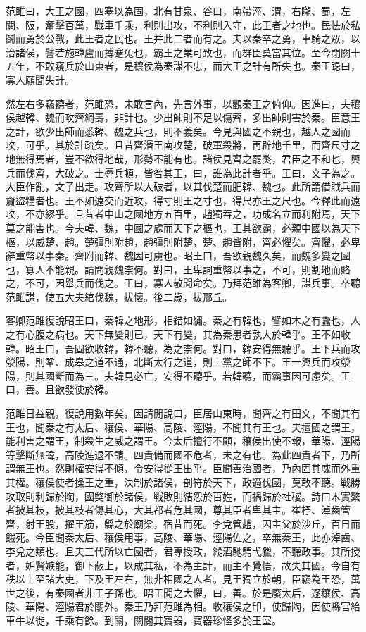 范雎曰，大王之國，四塞以為固，北有甘泉、谷口，南帶涇、渭，右隴、蜀，左關、阪，奮擊百萬，戰車千乘，利則出攻，不利則入守，此王者之地也。民怯於私鬬而勇於公戰，此王者之民也。王并此二者而有之。夫以秦卒之勇，車騎之眾，以治諸侯，譬若施韓盧而搏蹇兔也，霸王之業可致也，而群臣莫當其位。至今閉關十五年，不敢窺兵於山東者，是穰侯為秦謀不忠，而大王之計有所失也。秦王跽曰，寡人願聞失計。

然左右多竊聽者，范雎恐，未敢言內，先言外事，以觀秦王之俯仰。因進曰，夫穰侯越韓、魏而攻齊綱壽，非計也。少出師則不足以傷齊，多出師則害於秦。臣意王之計，欲少出師而悉韓、魏之兵也，則不義矣。今見與國之不親也，越人之國而攻，可乎。其於計疏矣。且昔齊湣王南攻楚，破軍殺將，再辟地千里，而齊尺寸之地無得焉者，豈不欲得地哉，形勢不能有也。諸侯見齊之罷獘，君臣之不和也，興兵而伐齊，大破之。士辱兵頓，皆咎其王，曰，誰為此計者乎。王曰，文子為之。大臣作亂，文子出走。攻齊所以大破者，以其伐楚而肥韓、魏也。此所謂借賊兵而齎盜糧者也。王不如遠交而近攻，得寸則王之寸也，得尺亦王之尺也。今釋此而遠攻，不亦繆乎。且昔者中山之國地方五百里，趙獨吞之，功成名立而利附焉，天下莫之能害也。今夫韓、魏，中國之處而天下之樞也，王其欲霸，必親中國以為天下樞，以威楚、趙。楚彊則附趙，趙彊則附楚，楚、趙皆附，齊必懼矣。齊懼，必卑辭重幣以事秦。齊附而韓、魏因可虜也。昭王曰，吾欲親魏久矣，而魏多變之國也，寡人不能親。請問親魏柰何。對曰，王卑詞重幣以事之，不可，則割地而賂之，不可，因舉兵而伐之。王曰，寡人敬聞命矣。乃拜范雎為客卿，謀兵事。卒聽范雎謀，使五大夫綰伐魏，拔懷。後二歲，拔邢丘。

客卿范雎復說昭王曰，秦韓之地形，相錯如繡。秦之有韓也，譬如木之有蠹也，人之有心腹之病也。天下無變則已，天下有變，其為秦患者孰大於韓乎。王不如收韓。昭王曰，吾固欲收韓，韓不聽，為之柰何。對曰，韓安得無聽乎。王下兵而攻滎陽，則鞏、成皋之道不通，北斷太行之道，則上黨之師不下。王一興兵而攻滎陽，則其國斷而為三。夫韓見必亡，安得不聽乎。若韓聽，而霸事因可慮矣。王曰，善。且欲發使於韓。

范雎日益親，復說用數年矣，因請閒說曰，臣居山東時，聞齊之有田文，不聞其有王也，聞秦之有太后、穰侯、華陽、高陵、涇陽，不聞其有王也。夫擅國之謂王，能利害之謂王，制殺生之威之謂王。今太后擅行不顧，穰侯出使不報，華陽、涇陽等擊斷無諱，高陵進退不請。四貴備而國不危者，未之有也。為此四貴者下，乃所謂無王也。然則權安得不傾，令安得從王出乎。臣聞善治國者，乃內固其威而外重其權。穰侯使者操王之重，決制於諸侯，剖符於天下，政適伐國，莫敢不聽。戰勝攻取則利歸於陶，國獘御於諸侯，戰敗則結怨於百姓，而禍歸於社稷。詩曰木實繁者披其枝，披其枝者傷其心，大其都者危其國，尊其臣者卑其主。崔杼、淖齒管齊，射王股，擢王筋，縣之於廟梁，宿昔而死。李兌管趙，囚主父於沙丘，百日而餓死。今臣聞秦太后、穰侯用事，高陵、華陽、涇陽佐之，卒無秦王，此亦淖齒、李兌之類也。且夫三代所以亡國者，君專授政，縱酒馳騁弋獵，不聽政事。其所授者，妒賢嫉能，御下蔽上，以成其私，不為主計，而主不覺悟，故失其國。今自有秩以上至諸大吏，下及王左右，無非相國之人者。見王獨立於朝，臣竊為王恐，萬世之後，有秦國者非王子孫也。昭王聞之大懼，曰，善。於是廢太后，逐穰侯、高陵、華陽、涇陽君於關外。秦王乃拜范雎為相。收穰侯之印，使歸陶，因使縣官給車牛以徙，千乘有餘。到關，關閱其寶器，寶器珍怪多於王室。

